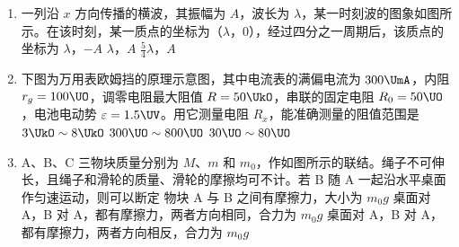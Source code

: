 \documentclass[\gkver]{gaokaozhenti}
\begin{document}
\begin{enumerate}

\item
一列沿 $x$ 方向传播的横波，其振幅为 $A$，波长为 $\lambda$，某一时刻波的图象如图所示。在该时刻，某一质点的坐标为（$\lambda$，0），经过四分之一周期后，该质点的坐标为
\onepicture[w=6cm]{}
{$\lambda$，$-A$}
{$\lambda$，$A$}
{$\frac{5}{4}\lambda$，$A$}


\item
下图为万用表欧姆挡的原理示意图，其中电流表的满偏电流为 $300\UmA$，内阻 $r_{g}=100\UO$，调零电阻最大阻值 $R=50\UkO$，串联的固定电阻 $R_{0}=50\UO$，电池电动势 $\varepsilon=1.5\UV$。用它测量电阻 $R_{x}$，能准确测量的阻值范围是
{$3\UkO\sim8\UkO$}
{$300\UO\sim800\UO$}
{$30\UO\sim80\UO$}


\item
A、B、C 三物块质量分别为 $M$、$m$ 和 $m_{0}$，作如图所示的联结。绳子不可伸长，且绳子和滑轮的质量、滑轮的摩擦均可不计。若 B 随 A 一起沿水平桌面作匀速运动，则可以断定
{物块 A 与 B 之间有摩擦力，大小为 $m_{0}g$}
{桌面对 A，B 对 A，都有摩擦力，两者方向相同，合力为 $m_{0}g$}
{桌面对 A，B 对 A，都有摩擦力，两者方向相反，合力为 $m_{0}g$}


\end{enumerate}
\end{document}
